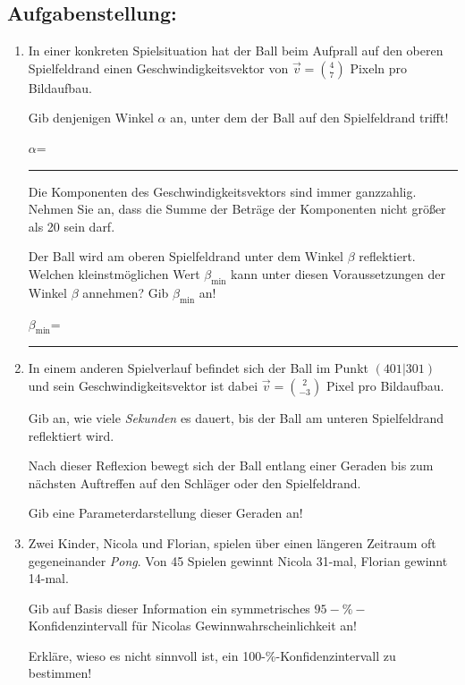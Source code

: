 \begin{langesbeispiel}
\subsection{Aufgabenstellung:}
\begin{enumerate}
	\item In einer konkreten Spielsituation hat der Ball beim Aufprall auf den oberen Spielfeldrand einen Geschwindigkeitsvektor von $\vec{v}=\binom{4}{7}$ Pixeln pro Bildaufbau.
	
	 Gib denjenigen Winkel $\alpha$ an, unter dem der Ball auf den Spielfeldrand trifft!
	
	$\alpha$= \rule{5cm}{0.3pt}
	
	Die Komponenten des Geschwindigkeitsvektors sind immer ganzzahlig. Nehmen Sie an, dass die Summe der Beträge der Komponenten nicht größer als 20 sein darf.
	
	Der Ball wird am oberen Spielfeldrand unter dem Winkel $\beta$ reflektiert. Welchen kleinstmöglichen Wert $\beta_\text{min}$ kann unter diesen Voraussetzungen der Winkel $\beta$ annehmen? Gib $\beta_\text{min}$ an!
	
	$\beta_\text{min}$= \rule{5cm}{0.3pt}
	
	\item In einem anderen Spielverlauf befindet sich der Ball im Punkt $(401|301)$ und sein Geschwindigkeitsvektor ist dabei $\vec{v}=\binom{2}{-3}$ Pixel pro Bildaufbau.
	
	Gib an, wie viele \textit{Sekunden} es dauert, bis der Ball am unteren Spielfeldrand reflektiert wird.
	
	Nach dieser Reflexion bewegt sich der Ball entlang einer Geraden bis zum nächsten Auftreffen auf den Schläger oder den Spielfeldrand.
	
 Gib eine Parameterdarstellung dieser Geraden an! 

\item Zwei Kinder, Nicola und Florian, spielen über einen längeren Zeitraum oft gegeneinander \textit{Pong}. Von 45 Spielen gewinnt Nicola 31-mal, Florian gewinnt 14-mal.
 
		Gib auf Basis dieser Information ein symmetrisches $95-\%-$Konfidenzintervall für Nicolas Gewinnwahrscheinlichkeit an!
		
		Erkläre, wieso es nicht sinnvoll ist, ein 100-\%-Konfidenzintervall zu bestimmen!
\end{enumerate}
\end{langesbeispiel}
